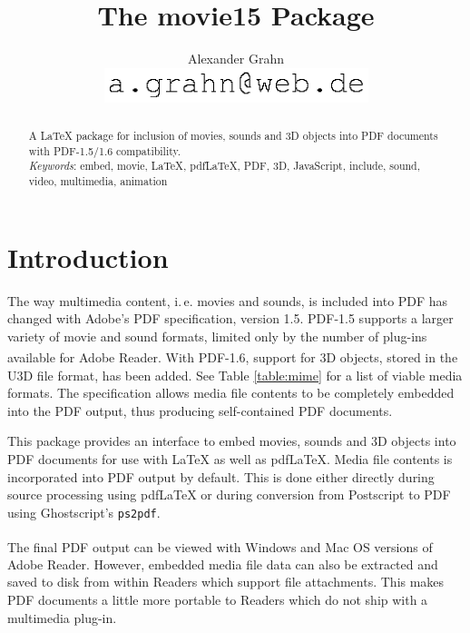 \documentclass[a4paper]{article}
\begin{document}
\title{The {\sffamily movie15} Package}
\author{Alexander Grahn\\[1ex]\includegraphics[height=2.7ex]{mailto}}
\maketitle

\begin{abstract}\noindent
A \LaTeX{} package for inclusion of movies, sounds and 3D objects into PDF documents with PDF-1.5/1.6 compatibility.\\[0.2\baselineskip]
\emph{Keywords}: embed, movie, LaTeX, pdfLaTeX, PDF, 3D, JavaScript, \mbox{include}, sound, video, multimedia, animation
\end{abstract}

\tableofcontents

\newpage
\section{Introduction}

The way multimedia content, i.\,e. movies and sounds, is included into PDF has changed with Adobe's PDF specification, version 1.5. PDF-1.5 supports a larger variety of movie and sound formats, limited only by the number of plug-ins available for Adobe Reader\textsuperscript{\scriptsize\textregistered}. With PDF-1.6, support for 3D objects, stored in the U3D file format, has been added. See Table \ref{table:mime} for a list of viable media formats. The specification allows media file contents to be completely embedded into the PDF output, thus producing self-contained PDF documents.

This package provides an interface to embed movies, sounds and 3D objects into PDF documents for use with \LaTeX{} as well as pdf\LaTeX. Media file contents is incorporated into PDF output by default. This is done either directly during source processing using pdf\LaTeX{} or during conversion from Postscript to PDF using Ghostscript's \verb+ps2pdf+.

The final PDF output can be viewed with Windows\textsuperscript{\scriptsize\textregistered} and Mac OS\textsuperscript{\scriptsize\textregistered} versions of Adobe Reader. However, embedded media file data can also be extracted and saved to disk from within Readers which support file attachments. This makes PDF documents a little more portable to Readers which do not ship with a multimedia plug-in.
\end{document}
